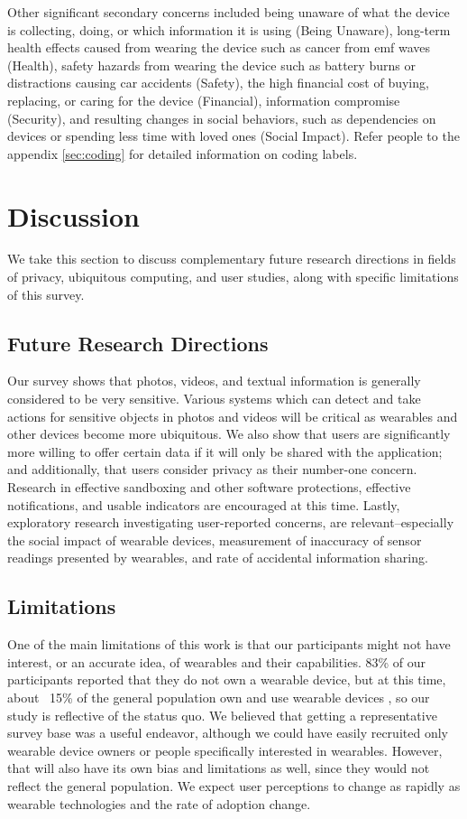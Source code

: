 \documentclass{acm_proc_article-sp}
\begin{document}
Other significant secondary concerns included being unaware of what the device is collecting, doing, or which information it is using (Being Unaware), long-term health effects caused from wearing the device such as cancer from emf waves (Health), safety hazards from wearing the device such as battery burns or distractions causing car accidents (Safety), the high financial cost of buying, replacing, or caring for the device (Financial),  information compromise (Security), and resulting changes in social behaviors, such as dependencies on devices or spending less time with loved ones (Social Impact). Refer people to the appendix \ref{sec:coding} for detailed information on coding labels. 


\section{Discussion}
We take this section to discuss complementary future research directions in fields of privacy, ubiquitous computing, and user studies, along with specific limitations of this survey. 

\subsection{Future Research Directions}

Our survey shows that photos, videos, and textual information is generally considered to be very sensitive. Various systems which can detect and take actions for sensitive objects in photos and videos will be critical as wearables and other devices become more ubiquitous. We also show that users are significantly more willing to offer certain data if it will only be shared with the application; and additionally, that users consider privacy as their number-one concern. Research in effective sandboxing and other software protections, effective notifications, and usable indicators are encouraged at this time. Lastly, exploratory research investigating user-reported concerns, are relevant--especially the social impact of wearable devices, measurement of inaccuracy of sensor readings presented by wearables, and rate of accidental information sharing. 

\subsection{Limitations}
One of the main limitations of this work is that our participants might not have interest, or an accurate idea, of wearables and their capabilities. 83\% of our participants reported that they do not own a wearable device, but at this time, about ~15\% of the general population own and use wearable devices \cite{Nilsen,WearableStatNews}, so our study is reflective of the status quo. We believed that getting a representative survey base was a useful endeavor, although we could have easily recruited only wearable device owners or people specifically interested in wearables. However, that will also have its own bias and limitations as well, since they would not reflect the general population. We expect user perceptions to change as rapidly as wearable technologies and the rate of adoption change. 
\end{document}
